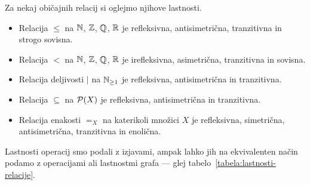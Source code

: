                 \begin{zgled}
                        Za nekaj običajnih relacij si oglejmo njihove lastnosti.
                        \begin{itemize}
                                \item
                                        Relacija $\leq$ na $\mathbb{N}$, $\mathbb{Z}$, $\mathbb{Q}$, $\mathbb{R}$ je refleksivna, antisimetrična, tranzitivna in strogo sovisna.
                                \item
                                        Relacija $<$ na $\mathbb{N}$, $\mathbb{Z}$, $\mathbb{Q}$, $\mathbb{R}$ je irefleksivna, asimetrična, tranzitivna in sovisna.
                                \item
                                        Relacija deljivosti $|$ na $\mathbb{N}_{\geq 1}$ je refleksivna, antisimetrična in tranzitivna.
                                \item
                                        Relacija $\subseteq$ na $\mathcal{P}(X)$ je refleksivna, antisimetrična in tranzitivna.
                                \item
                                        Relacija enakosti $=_X$ na katerikoli množici $X$ je refleksivna, simetrična, antisimetrična, tranzitivna in enolična.
                        \end{itemize}
                \end{zgled}

                Lastnosti operacij smo podali z izjavami, ampak lahko jih na ekvivalenten način podamo z operacijami ali lastnostmi grafa --- glej tabelo~\ref{tabela:lastnosti-relacije}.

